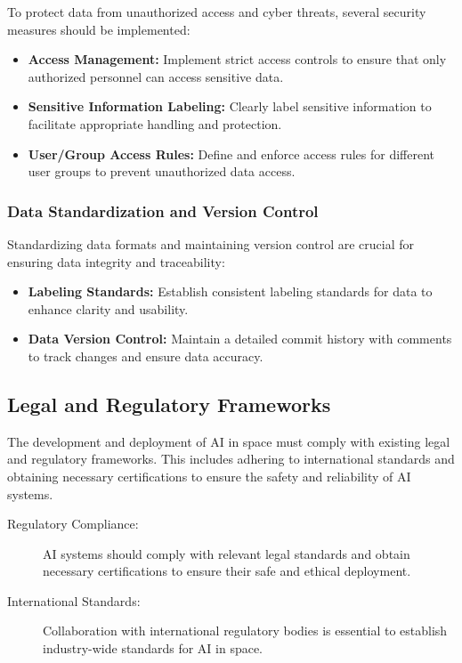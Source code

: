 \documentclass[a4paper,12pt]{article}
\begin{document}
To protect data from unauthorized access and cyber threats, several security measures should be implemented:

\begin{itemize}
    \item \textbf{Access Management:} Implement strict access controls to ensure that only authorized personnel can access sensitive data.
    \item \textbf{Sensitive Information Labeling:} Clearly label sensitive information to facilitate appropriate handling and protection.
    \item \textbf{User/Group Access Rules:} Define and enforce access rules for different user groups to prevent unauthorized data access.
\end{itemize}

\subsubsection{Data Standardization and Version Control}

Standardizing data formats and maintaining version control are crucial for ensuring data integrity and traceability:

\begin{itemize}
    \item \textbf{Labeling Standards:} Establish consistent labeling standards for data to enhance clarity and usability.
    \item \textbf{Data Version Control:} Maintain a detailed commit history with comments to track changes and ensure data accuracy.
\end{itemize}

\subsection{Legal and Regulatory Frameworks}

The development and deployment of AI in space must comply with existing legal and regulatory frameworks. This includes adhering to international standards and obtaining necessary certifications to ensure the safety and reliability of AI systems.

\begin{description}
    \item[Regulatory Compliance:] AI systems should comply with relevant legal standards and obtain necessary certifications to ensure their safe and ethical deployment.
    \item[International Standards:] Collaboration with international regulatory bodies is essential to establish industry-wide standards for AI in space.
\end{description}
\end{document}
